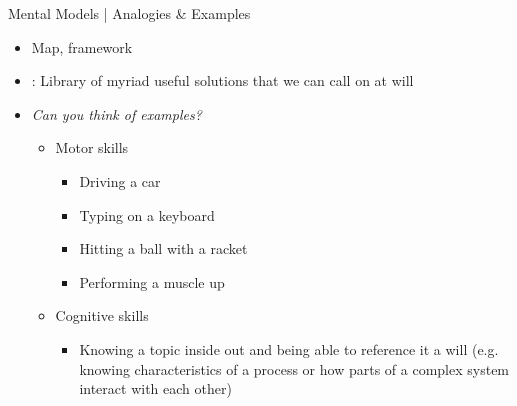 \documentclass{ercisbeamer}
\begin{document}
\begin{frame}{Mental Models | Analogies \& Examples}
    \begin{tbox}
        \begin{itemize}
            \item Map, framework
            \item {}: Library of myriad useful solutions that we can call on at will
        \end{itemize}
    \end{tbox}

    \vspace{.5em}

    \begin{tbox}
        \begin{itemize}
            \item \emph{Can you think of examples?} \pause
            \begin{itemize}
                \item Motor skills
                \begin{itemize}
                    \item Driving a car
                    \item Typing on a keyboard
                    \item Hitting a ball with a racket
                    \item Performing a muscle up
                \end{itemize}
                \item Cognitive skills
                \begin{itemize}
                    \item Knowing a topic inside out and being able to reference it a will (e.g. knowing characteristics of a process or how parts of a complex system interact with each other)
                \end{itemize}
            \end{itemize}
        \end{itemize}    
    \end{tbox}
\end{frame}
\end{document}
